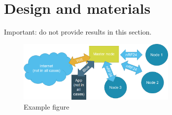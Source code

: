 \chapter{Design and materials}

Important: do not provide results in this section.

\begin{figure}[h]
	\centering\includegraphics[height=3cm]{./images/blockschema}
	\caption{Example figure}
\end{figure}
